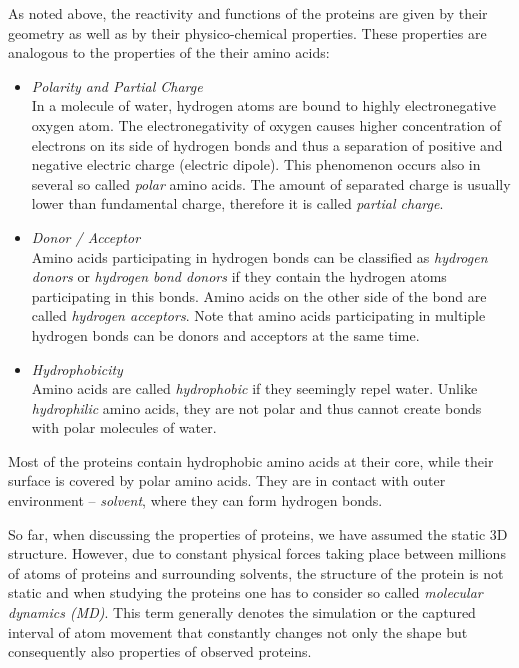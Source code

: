 As noted above, the reactivity and functions of the proteins are given by their geometry as well as by their physico-chemical properties. These properties are analogous to the properties of the their amino acids:

\begin{itemize}
\setlength\itemsep{0.5pt}
\item{\textit{Polarity and Partial Charge}} \\ 
In a molecule of water, hydrogen atoms are bound to highly electronegative oxygen atom. The electronegativity of oxygen causes higher concentration of electrons on its side of hydrogen bonds and thus a separation of positive and negative electric charge (electric dipole). This phenomenon occurs also in several so called \textit{polar} amino acids. The amount of separated charge is usually lower than fundamental charge, therefore it is called \textit{partial charge}. 
\item{\textit{Donor / Acceptor}} \\
Amino acids participating in hydrogen bonds can be classified as \textit{hydrogen donors} or \textit{hydrogen bond donors} if they contain the hydrogen atoms participating in this bonds. Amino acids on the other side of the bond are called \textit{hydrogen acceptors}. Note that amino acids participating in multiple hydrogen bonds can be donors and acceptors at the same time.
\item{\textit{Hydrophobicity}} \\
 Amino acids are called \textit{hydrophobic} if they seemingly repel water. Unlike \textit{hydrophilic} amino acids, they are not polar and thus cannot create bonds with polar molecules of water.
\end{itemize}

Most of the proteins contain hydrophobic amino acids at their core, while their surface is covered by polar amino acids. They are in contact with outer environment -- \textit{solvent}, where they can form hydrogen bonds.

So far, when discussing the properties of proteins, we have assumed the static 3D structure. However, due to constant physical forces taking place between millions of atoms of proteins and surrounding solvents, the structure of the protein is not static and when studying the proteins one has to consider so called \textit{molecular dynamics (MD)}. This term generally denotes the simulation or the captured interval of atom movement that constantly changes not only the shape but consequently also properties of observed proteins. 

